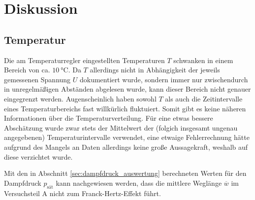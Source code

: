 \section{Diskussion}
\subsection{Temperatur}
Die am Temperaturregler eingestellten Temperaturen $T$ schwanken in einem Bereich von ca. $\qty[]{10}{\celsius}$.
Da $T$ allerdings nicht in Abhängigkeit der jeweils gemessenen Spannung $U$ dokumentiert wurde, 
sondern immer nur zwischendurch in unregelmäßigen Abständen abgelesen wurde, kann dieser Bereich nicht genauer eingegrenzt werden.
Augenscheinlich haben sowohl $T$ als auch die Zeitintervalle eines Temperaturbereichs fast willkürlich fluktuiert.
Somit gibt es keine näheren Informationen über die Temperaturverteilung.
Für eine etwas bessere Abschätzung wurde zwar stets der Mittelwert der (folgich insgesamt ungenau angegebenen) Temperaturintervalle verwendet,
eine etwaige Fehlerrechnung hätte aufgrund des Mangels an Daten allerdings keine große Aussagekraft, weshalb auf diese verzichtet wurde.

\noindent
Mit den in Abschnitt \ref{sec:dampfdruck_auswertung} berechneten Werten für den Dampfdruck $p_\text{sät}$ 
kann nachgewiesen werden, dass die mittlere Weglänge $\overline{w}$ im Versuchsteil A nicht zum Franck-Hertz-Effekt führt.
